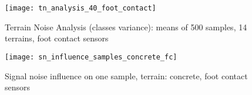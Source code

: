 \begin{figure}[H]
  \centering
  \texttt{[image: tn\_analysis\_40\_foot\_contact]}
  \caption{Terrain Noise Analysis (classes variance): means of 500 samples, 14 terrains, foot contact sensors}
  \label{fig:tn_analysis_foot_contact}
\end{figure}

\begin{figure}[H]
  \centering
  \texttt{[image: sn\_influence\_samples\_concrete\_fc]}
  \caption{Signal noise influence on one sample, terrain: concrete, foot contact sensors}
  \label{fig:sn_influence_samples_concrete_fc}
\end{figure}

%
